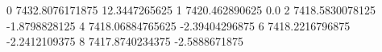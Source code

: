 0 7432.8076171875 12.3447265625
1 7420.462890625 0.0
2 7418.5830078125 -1.8798828125
4 7418.06884765625 -2.39404296875
6 7418.2216796875 -2.2412109375
8 7417.8740234375 -2.5888671875
